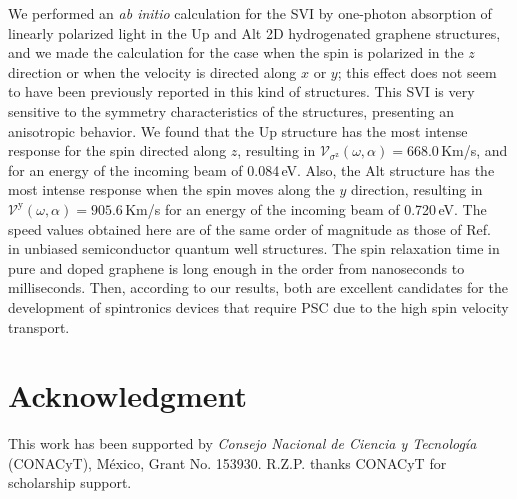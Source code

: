 \documentclass[floatfix,prb,aps,superscriptaddress,showpacs,11pt,preprint,letterpaper]{revtex4}
\begin{document}
We performed an \emph{ab initio} calculation for the SVI by one-photon
absorption of linearly polarized light in the Up and Alt 2D hydrogenated
graphene structures, and we made the calculation for the case when the spin is
polarized in the $z$ direction or when the velocity is directed along $x$ or
$y$; this effect does not seem to have been previously reported in this kind of
structures.
% 
This SVI is very sensitive to the symmetry characteristics of the structures,
presenting an anisotropic behavior. We found that the Up structure has
the most intense response for the spin directed along $z$, resulting in 
% 
$\mathcal{V}_{\sigma^{\mathrm{z}}} (\omega,\alpha) = 668.0$\,Km/s, and 
% 
for an energy of the incoming beam of 0.084\,eV. Also, the Alt structure
has the most intense response when the spin moves along the $y$ direction,
resulting in 
% 
$\mathcal{V}^{\mathrm{y}} (\omega,\alpha) = 905.6$\,Km/s
% 
for an energy of the incoming beam of 0.720\,eV.
% 
The speed values obtained here are of the same order of magnitude
as those of Ref.~ in 
unbiased semiconductor quantum well structures.
The spin relaxation time in pure and doped graphene is long enough in the order
from nanoseconds to milliseconds. \cite{wojtaszekPRB13,ertlerPRB09} Then,
according to our results, both are excellent candidates for the development of
spintronics devices that require PSC due to the high spin velocity transport.

\section{Acknowledgment} %

This work has been supported by \emph{Consejo Nacional de Ciencia y
Tecnolog\'ia} (CONACyT), M\'exico, Grant No. 153930.
R.Z.P. thanks CONACyT for scholarship support.

\end{document}
